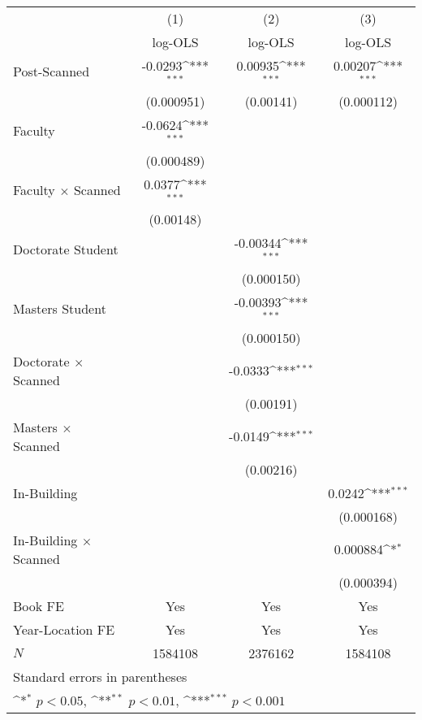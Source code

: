 {
\def\sym#1{\ifmmode^{#1}\else\(^{#1}\)\fi}
\begin{tabular}{l*{3}{c}}
\hline\hline
            &\multicolumn{1}{c}{(1)}&\multicolumn{1}{c}{(2)}&\multicolumn{1}{c}{(3)}\\
            &\multicolumn{1}{c}{log-OLS}&\multicolumn{1}{c}{log-OLS}&\multicolumn{1}{c}{log-OLS}\\
\hline
Post-Scanned&     -0.0293\sym{***}&     0.00935\sym{***}&     0.00207\sym{***}\\
            &  (0.000951)         &   (0.00141)         &  (0.000112)         \\
[1em]
Faculty     &     -0.0624\sym{***}&                     &                     \\
            &  (0.000489)         &                     &                     \\
[1em]
Faculty $\times$ Scanned&      0.0377\sym{***}&                     &                     \\
            &   (0.00148)         &                     &                     \\
[1em]
Doctorate Student&                     &    -0.00344\sym{***}&                     \\
            &                     &  (0.000150)         &                     \\
[1em]
Masters Student&                     &    -0.00393\sym{***}&                     \\
            &                     &  (0.000150)         &                     \\
[1em]
Doctorate $\times$ Scanned&                     &     -0.0333\sym{***}&                     \\
            &                     &   (0.00191)         &                     \\
[1em]
Masters $\times$  Scanned&                     &     -0.0149\sym{***}&                     \\
            &                     &   (0.00216)         &                     \\
[1em]
In-Building &                     &                     &      0.0242\sym{***}\\
            &                     &                     &  (0.000168)         \\
[1em]
In-Building $\times$ Scanned&                     &                     &    0.000884\sym{*}  \\
            &                     &                     &  (0.000394)         \\
\hline
Book FE     &         Yes         &         Yes         &         Yes         \\
Year-Location FE&         Yes         &         Yes         &         Yes         \\
\(N\)       &     1584108         &     2376162         &     1584108         \\
\hline\hline
\multicolumn{4}{l}{\footnotesize Standard errors in parentheses}\\
\multicolumn{4}{l}{\footnotesize \sym{*} \(p<0.05\), \sym{**} \(p<0.01\), \sym{***} \(p<0.001\)}\\
\end{tabular}
}
